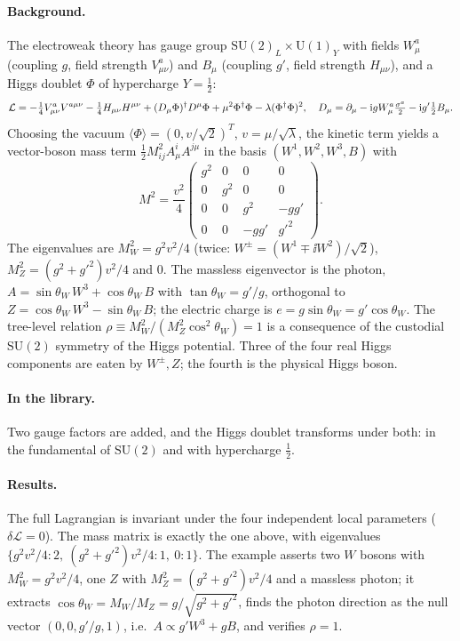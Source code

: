 \paragraph{Background.} The electroweak theory \cite{Glashow1961,Weinberg1967,Salam1968} has gauge group $\mathrm{SU}(2)_L\times\mathrm U(1)_Y$ with fields $W^a_\mu$ (coupling $g$, field strength $V^a_{\mu\nu}$) and $B_\mu$ (coupling $g'$, field strength $H_{\mu\nu}$), and a Higgs doublet $\Phi$ of hypercharge $Y=\tfrac12$:
\begin{equation}
\mathcal L=-\tfrac14V^a_{\mu\nu}V^{a\mu\nu}-\tfrac14H_{\mu\nu}H^{\mu\nu}+(D_\mu\Phi)^\dagger D^\mu\Phi+\mu^2\Phi^\dagger\Phi-\lambda(\Phi^\dagger\Phi)^2,\quad
D_\mu=\partial_\mu-\mathrm{i} gW^a_\mu\tfrac{\sigma^a}{2}-\mathrm{i} g'\tfrac12B_\mu.
\end{equation}
Choosing the vacuum $\langle\Phi\rangle=(0,v/\sqrt2)^T$, $v=\mu/\sqrt\lambda$, the kinetic term yields a vector-boson mass term $\tfrac12M^2_{ij}A^i_\mu A^{j\mu}$ in the basis $(W^1,W^2,W^3,B)$ with
\begin{equation}
M^2=\frac{v^2}4\begin{pmatrix}g^2&0&0&0\\0&g^2&0&0\\0&0&g^2&-gg'\\0&0&-gg'&g'^2\end{pmatrix}.
\end{equation}
The eigenvalues are $M_W^2=g^2v^2/4$ (twice: $W^\pm=(W^1\mp\ii W^2)/\sqrt2$), $M_Z^2=(g^2+g'^2)v^2/4$ and $0$. The massless eigenvector is the photon, $A=\sin\theta_W\,W^3+\cos\theta_W\,B$ with $\tan\theta_W=g'/g$, orthogonal to $Z=\cos\theta_W\,W^3-\sin\theta_W\,B$; the electric charge is $e=g\sin\theta_W=g'\cos\theta_W$. The tree-level relation $\rho\equiv M_W^2/(M_Z^2\cos^2\theta_W)=1$ is a consequence of the custodial $\mathrm{SU}(2)$ symmetry of the Higgs potential. Three of the four real Higgs components are eaten by $W^\pm,Z$; the fourth is the physical Higgs boson.

\paragraph{In the library.} Two gauge factors are added, and the Higgs doublet transforms under both: in the fundamental of $\mathrm{SU}(2)$ and with hypercharge $\tfrac12$.


\paragraph{Results.} The full Lagrangian is invariant under the four independent local parameters ($\delta\mathcal L=0$). The mass matrix is exactly the one above, with eigenvalues $\{g^2v^2/4:2,\ (g^2+g'^2)v^2/4:1,\ 0:1\}$. The example asserts two $W$ bosons with $M_W^2=g^2v^2/4$, one $Z$ with $M_Z^2=(g^2+g'^2)v^2/4$ and a massless photon; it extracts $\cos\theta_W=M_W/M_Z=g/\sqrt{g^2+g'^2}$, finds the photon direction as the null vector $(0,0,g'/g,1)$, i.e.\ $A\propto g'W^3+gB$, and verifies $\rho=1$.

